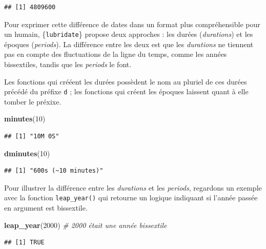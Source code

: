 \documentclass[
  11pt,
]{book}
\newenvironment{Shaded}{\begin{snugshade}}{\end{snugshade}}
\newcommand{\CommentTok}[1]{\textcolor[rgb]{0.56,0.35,0.01}{\textit{#1}}}
\newcommand{\DecValTok}[1]{\textcolor[rgb]{0.00,0.00,0.81}{#1}}
\newcommand{\KeywordTok}[1]{\textcolor[rgb]{0.13,0.29,0.53}{\textbf{#1}}}
\newcommand{\NormalTok}[1]{#1}
\numberwithin{equation}{section}
\numberwithin{countremarque}{section}
\begin{document}
\begin{lstlisting}
## [1] 4809600
\end{lstlisting}

Pour exprimer cette différence de dates dans un format plus compréhensible pour un humain, \{\texttt{lubridate}\} propose deux approches : les durées (\emph{durations}) et les époques (\emph{periods}). La différence entre les deux est que les \emph{durations} ne tiennent pas en compte des fluctuations de la ligne du temps, comme les années bissextiles, tandis que les \emph{periods} le font.

Les fonctions qui crééent les durées possèdent le nom au pluriel de ces durées précédé du préfixe \texttt{d} ; les fonctions qui créent les époques laissent quant à elle tomber le préxixe.

\begin{Shaded}
\begin{Highlighting}[]
\KeywordTok{minutes}\NormalTok{(}\DecValTok{10}\NormalTok{)}
\end{Highlighting}
\end{Shaded}

\begin{lstlisting}
## [1] "10M 0S"
\end{lstlisting}

\begin{Shaded}
\begin{Highlighting}[]
\KeywordTok{dminutes}\NormalTok{(}\DecValTok{10}\NormalTok{)}
\end{Highlighting}
\end{Shaded}

\begin{lstlisting}
## [1] "600s (~10 minutes)"
\end{lstlisting}

Pour illustrer la différence entre les \emph{durations} et les \emph{periods}, regardons un exemple avec la fonction \texttt{leap\_year()} qui retourne un logique indiquant si l'année passée en argument est bissextile.

\begin{Shaded}
\begin{Highlighting}[]
\KeywordTok{leap\_year}\NormalTok{(}\DecValTok{2000}\NormalTok{) }\CommentTok{\# 2000 était une année bissextile}
\end{Highlighting}
\end{Shaded}

\begin{lstlisting}
## [1] TRUE
\end{lstlisting}
\end{document}
